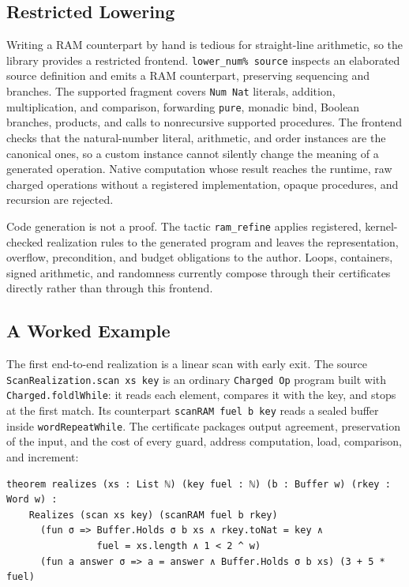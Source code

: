 \documentclass[acmsmall,nonacm]{acmart}
\begin{document}
\subsection{Restricted Lowering}\label{sec:lowering}

Writing a RAM counterpart by hand is tedious for straight-line arithmetic, so the library provides a restricted frontend.
\lstinline!lower_num% source! inspects an elaborated source definition and emits a RAM counterpart, preserving sequencing and branches.
The supported fragment covers \lstinline{Num Nat} literals, addition, multiplication, and comparison, forwarding \lstinline{pure}, monadic bind, Boolean branches, products, and calls to nonrecursive supported procedures.
The frontend checks that the natural-number literal, arithmetic, and order instances are the canonical ones, so a custom instance cannot silently change the meaning of a generated operation.
Native computation whose result reaches the runtime, raw charged operations without a registered implementation, opaque procedures, and recursion are rejected.

Code generation is not a proof.
The tactic \lstinline{ram_refine} applies registered, kernel-checked realization rules to the generated program and leaves the representation, overflow, precondition, and budget obligations to the author.
Loops, containers, signed arithmetic, and randomness currently compose through their certificates directly rather than through this frontend.

\subsection{A Worked Example}\label{sec:scan}

The first end-to-end realization is a linear scan with early exit.
The source \lstinline{ScanRealization.scan xs key} is an ordinary \lstinline{Charged Op} program built with \lstinline{Charged.foldlWhile}: it reads each element, compares it with the key, and stops at the first match.
Its counterpart \lstinline{scanRAM fuel b key} reads a sealed buffer inside \lstinline{wordRepeatWhile}.
The certificate packages output agreement, preservation of the input, and the cost of every guard, address computation, load, comparison, and increment:

\begin{lstlisting}
theorem realizes (xs : List ℕ) (key fuel : ℕ) (b : Buffer w) (rkey : Word w) :
    Realizes (scan xs key) (scanRAM fuel b rkey)
      (fun σ => Buffer.Holds σ b xs ∧ rkey.toNat = key ∧
                fuel = xs.length ∧ 1 < 2 ^ w)
      (fun a answer σ => a = answer ∧ Buffer.Holds σ b xs) (3 + 5 * fuel)
\end{lstlisting}
\end{document}
